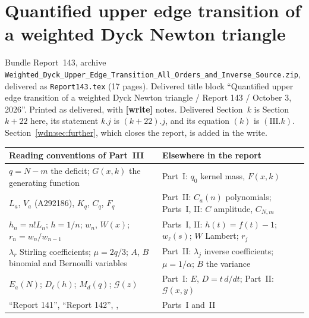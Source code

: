 \documentclass[11pt,letterpaper]{article}
\theoremstyle{remark}\newtheorem{remark}[theorem]{Remark}
\newcommand{\file}[1]{\nolinkurl{#1}}
\newcommand{\partsource}[1]{\par\noindent\begin{minipage}{\textwidth}\small #1\end{minipage}\par\medskip}
\newcommand{\parteqs}[1]{\setcounter{equation}{0}%
 \renewcommand{\theequation}{#1\arabic{equation}}%
 \renewcommand{\theHequation}{#1\arabic{equation}}}
\begin{document}
\part{Quantified upper edge transition of a weighted Dyck Newton triangle}\label{wdn:edge:part}
\parteqs{III.}
\partsource{Bundle Report~143, archive \file{Weighted_Dyck_Upper_Edge_Transition_All_Orders_and_Inverse_Source.zip}, delivered as \file{Report143.tex} (17 pages). Delivered title block ``Quantified upper edge transition of a weighted Dyck Newton triangle / Report 143 / October 3, 2026''. Printed as delivered, with \textbf{[write]} notes. Delivered Section~$k$ is Section~$k+22$ here, its statement $k.j$ is $(k+22).j$, and its equation $(k)$ is $(\mathrm{III}.k)$. Section~\ref{wdn:sec:further}, which closes the report, is added in the write.}
\begin{center}
\small
\begin{tabular}{@{}>{\raggedright\arraybackslash}p{} >{\raggedright\arraybackslash}p{}@{}}
\toprule
Reading conventions of Part~III & Elsewhere in the report\\
\midrule
$q=N-m$ the deficit; $G(x,k)$ the generating function & Part~I: $q_0$ kernel mass, $F(x,k)$\\
$L_a$, $V_a$ (A292186), $K_q$, $C_q$, $F_q$ & Part~II: $C_a(n)$ polynomials; Parts~I, II: $C$ amplitude, $C_{N,m}$\\
$h_n=n!L_n$; $h=1/n$; $w_n$, $W(x)$; $r_n=w_n/w_{n-1}$ & Parts~I, II: $h(t)=f(t)-1$; $w_\ell(s)$; $W$ Lambert; $r_j$\\
$\lambda_r$ Stirling coefficients; $\mu=2q/3$; $A$, $B$ binomial and Bernoulli variables & Part~II: $\lambda_j$ inverse coefficients; $\mu=1/\alpha$; $B$ the variance\\
$E_a(N)$; $D_\ell(h)$; $M_d(q)$; $\mathcal G(z)$ & Part~I: $E$, $D=t\,d/dt$; Part~II: $\mathcal G(x,y)$\\
``Report 141'', ``Report 142'', \cite{foundation}, \cite{interior} & Parts~I and~II\\
\bottomrule
\end{tabular}
\end{center}
\end{document}
